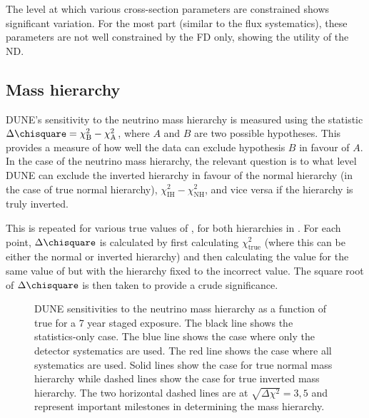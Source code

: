 The level at which various cross-section parameters are constrained shows significant variation. 
For the most part (similar to the flux systematics), these parameters are not well constrained by the FD only, showing the utility of the ND.


\subsection{Mass hierarchy}
\label{sec:dune_lbl:sensitivities:mh}

DUNE's sensitivity to the neutrino mass hierarchy is measured using the statistic $\Delta \chisquare = \chi^{2}_{\text{B}} - \chi^{2}_{\text{A}}$, where $A$ and $B$ are two possible hypotheses.
This provides a measure of how well the data can exclude hypothesis $B$ in favour of $A$.
In the case of the neutrino mass hierarchy, the relevant question is to what level DUNE can exclude the inverted hierarchy in favour of the normal hierarchy (in the case of true normal hierarchy), $\chi^{2}_{\text{IH}} - \chi^{2}_{\text{NH}}$, and vice versa if the hierarchy is truly inverted.

This is repeated for various true values of \dcp, for both hierarchies in .
For each \dcp point, $\Delta \chisquare$ is calculated by first calculating $\chi^{2}_{\text{true}}$ (where this can be either the normal or inverted hierarchy) and then calculating the \chisquare value for the same value of \dcp but with the hierarchy fixed to the incorrect value.
The square root of $\Delta \chisquare$ is then taken to provide a crude significance.

\begin{figure}[h]
	\begin{adjustbox}{max totalsize=.6\linewidth, center}
		
	\end{adjustbox}
	\caption[DUNE sensitivity to the neutrino mass hierarchy as a function of true \dcp.]{DUNE sensitivities to the neutrino mass hierarchy as a function of true \dcp for a 7 year staged exposure. The black line shows the statistics-only case. The blue line shows the case where only the detector systematics are used. The red line shows the case where all systematics are used. Solid lines show the case for true normal mass hierarchy while dashed lines show the case for true inverted mass hierarchy. The two horizontal dashed lines are at $\sqrt{\Delta\chi^{2}} = 3, 5$ and represent important milestones in determining the mass hierarchy.}
	\label{fig:mhSens}
\end{figure}

